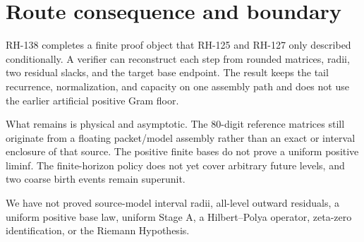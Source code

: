 \documentclass[12pt]{article}
\begin{document}
\section{Route consequence and boundary}
RH-138 completes a finite proof object that RH-125 and RH-127 only described
conditionally.  A verifier can reconstruct each step from rounded matrices,
radii, two residual slacks, and the target base endpoint.  The result keeps
the tail recurrence, normalization, and capacity on one assembly path and
does not use the earlier artificial positive Gram floor.

What remains is physical and asymptotic.  The 80-digit reference matrices
still originate from a floating packet/model assembly rather than an exact
or interval enclosure of that source.  The positive finite bases do not
prove a uniform positive liminf.  The finite-horizon policy does not yet
cover arbitrary future levels, and two coarse birth events remain superunit.

We have not proved source-model interval radii, all-level outward residuals,
a uniform positive base law, uniform Stage A, a Hilbert--Polya operator,
zeta-zero identification, or the Riemann Hypothesis.



\end{document}

